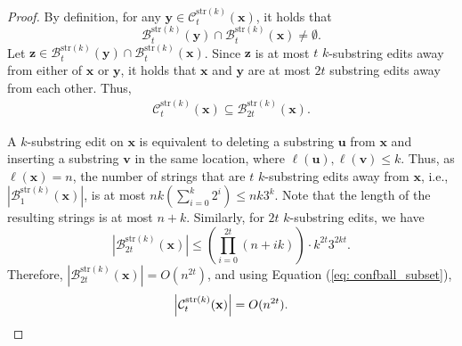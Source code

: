 \documentclass[onecolumn]{IEEEtran}
\newcommand{\bl}{n}
\newcommand{\numedits}{t}
\newcommand{\editsize}{k}
\newcommand{\confball}[3]{\mathcal{C}_{#1}^{#2}(#3)}
\newcommand{\editball}[3]{\mathcal{B}_{#1}^{#2}(#3)}
\newcommand{\length}[1]{{\ell}(#1)}
\newcommand{\tksub}{$\numedits$ $\editsize$-substring\xspace}
\newcommand{\bfx}{{\mathbf{ x}}}
\newcommand{\bfy}{{\mathbf{ y}}}
\begin{document}
\begin{proof}
    By definition, for any $ \mathbf{y} \in \confball{\numedits}{\mathrm{str}(\editsize)}{\mathbf{x}}$, it holds that $$\editball{\numedits}{\mathrm{str}(\editsize)}{\mathbf{y}} \cap \editball{\numedits}{\mathrm{str}(\editsize)}{\mathbf{x}}\neq \emptyset.$$ Let $\mathbf{z} \in \editball{\numedits}{\mathrm{str}(\editsize)}{\mathbf{y}} \cap \editball{\numedits}{\mathrm{str}(\editsize)}{\mathbf{x}}$. Since $\mathbf{z}$ is at most \tksub edits away from either of $\bfx$ or $\bfy$, it holds that $\bfx$ and $\bfy$ are at most $2\numedits$ substring edits away from each other. Thus, 
    \begin{align}
    \label{eq: confball_subset}
        \confball{\numedits}{\mathrm{str}(\editsize)}{\mathbf{x}} \subseteq \editball{2\numedits}{\mathrm{str}(k)}{\mathbf{x}}.
    \end{align}
    
    A $\editsize$-substring edit on $\mathbf{x}$ is equivalent to deleting a substring $\mathbf{u}$ from $\mathbf{x}$ and inserting a substring $\mathbf{v}$ in the same location, where $\length{\mathbf{u}}, \length{\mathbf{v}} \leq \editsize$. Thus, as $\length{\mathbf{x}} = n$, the number of strings that are \tksub edits away from $\mathbf{x}$, i.e., $\left|\editball{1}{\mathrm{str}(k)}{\mathbf{x}}\right|$, is at most $\bl\editsize(\sum_{i=0}^\editsize 2^i) \leq \bl\editsize3^\editsize$. Note that the length of the resulting strings is at most $\bl+\editsize$. 
    Similarly, for $2\numedits$ $\editsize$-substring edits, we have
    \begin{equation}\label{eq:ballsize}
        \left|\editball{2\numedits}{\mathrm{str}(k)}{\mathbf{x}}\right| \leq \left(\prod_{i=0}^{2\numedits}(n+i\editsize)\right)\cdot\editsize^{2\numedits} 3^{2\editsize\numedits}.
    \end{equation}
    Therefore, $\left|\editball{2\numedits}{\mathrm{str}(k)}{\mathbf{x}}\right|= O(\bl^{2t})$, and  using Equation (\ref{eq: confball_subset}), 
    \begin{equation*}
        \left|\confball{\numedits}{\mathrm{str}(\editsize)}{\mathbf{x}}\right| = O(\bl^{2t}).\qedhere
    \end{equation*}
\end{proof}
\end{document}
